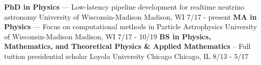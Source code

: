 


\vspace{-0.2cm}

\begin{cventries}
  \cventry
    {\textbf{PhD in Physics} --- Low-latency pipeline development for realtime neutrino astronomy} %
    {University of Wisconsin-Madison} %
    {Madison, WI}  %
    {7/17 - present} %
    {}
\vspace{-0.7cm}
   \cventry
    {\textbf{MA in Physics} --- Focus on computational methods in Particle Astrophysics} %
    {University of Wisconsin-Madison} %
    {Madison, WI}  %
    {7/17 - 10/19} %
    {}
\vspace{-0.7cm}
  \cventry
    {\textbf{BS in Physics, Mathematics, and Theoretical Physics \& Applied Mathematics} -- Full tuition presidential scholar} %
    {Loyola University Chicago} %
    {Chicago, IL} %
    {8/13 - 5/17 } %
    {}

\end{cventries}
